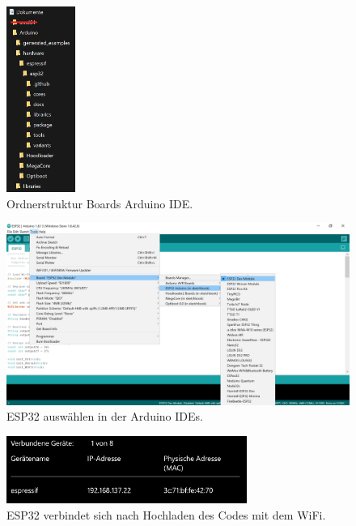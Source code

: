 \begin{figure}[H]
	\centering
	\includegraphics[width=0.2\textwidth]{graphics/ESP32_Ordner}
	\caption{Ordnerstruktur Boards Arduino IDE.}
	\label{fig:ESP32_Ordner}
\end{figure}

\begin{figure}[H]
	\centering
	\includegraphics[width=\textwidth]{graphics/ESP32_Arduino_IDE}
	\caption{ESP32 auswählen in der Arduino IDEs.}
	\label{fig:ESP32_Arduino_IDE}
\end{figure}

\begin{figure}[H]
	\centering
	\includegraphics[width=0.7\textwidth]{graphics/ESP32_Verbundene_Geraete}
	\caption{ESP32 verbindet sich nach Hochladen des Codes mit dem WiFi.}
	\label{fig:ESP32_Verbundene_Geraete}
\end{figure}

